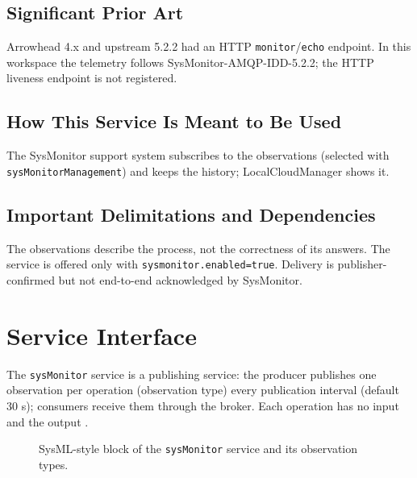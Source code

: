 \documentclass[a4paper]{arrowhead}
\newcommand{\mref}[2][]{{\textcolor{ArrowheadPurple}{\hyperref[sec:model:#2]{\ifstrempty{#1}{#2}{#1}}}}}
\begin{document}
\subsection{Significant Prior Art}

Arrowhead 4.x and upstream 5.2.2 had an HTTP \texttt{monitor}/\texttt{echo} endpoint. In this workspace the telemetry follows SysMonitor-AMQP-IDD-5.2.2; the HTTP liveness endpoint is not registered.

\subsection{How This Service Is Meant to Be Used}

The SysMonitor support system subscribes to the observations (selected with \texttt{sys\allowbreak{}Monitor\allowbreak{}Management}) and keeps the history; LocalCloudManager shows it.

\subsection{Important Delimitations and Dependencies}
\label{sec:delimitations}

The observations describe the process, not the correctness of its answers. The service is offered only with \texttt{sysmonitor.\allowbreak{}enabled=\allowbreak{}true}. Delivery is publisher-confirmed but not end-to-end acknowledged by SysMonitor.

\newpage

\section{Service Interface}
\label{sec:operations}

The \texttt{sysMonitor} service is a publishing service: the producer publishes one observation per operation (observation type) every publication interval (default 30 s); consumers receive them through the broker. Each operation has no input and the output \mref{Observation}.

\begin{figure}[ht!]
  \centering
  \caption{SysML-style block of the \texttt{sysMonitor} service and its observation types.}
  \label{fig:SD}
\end{figure}
\end{document}
